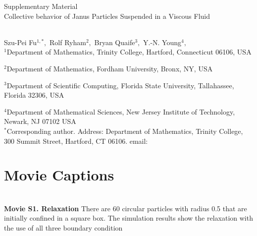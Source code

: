 
\thispagestyle{empty}

\newpage
{\Large \bf

  \noindent Supplementary Material\\

  \noindent 
  Collective behavior of Janus Particles  Suspended in a Viscous Fluid}\\

\noindent 
Szu-Pei Fu$^{1,*},$ 
Rolf Ryham$^{2},$ 
Bryan Quaife$^{3},$ 
Y.-N. Young$^{4},$
\\

\noindent
$^{1}$Department of Mathematics, Trinity College, Hartford, Connecticut 06106, USA

\noindent
$^{2}$Department of Mathematics, Fordham University,  Bronx, NY, USA

\noindent
$^{3}$Department of Scientific Computing, Florida State University, Tallahassee, Florida 32306, USA

\noindent
$^{4}$Department of Mathematical Sciences, New Jersey Institute of Technology, Newark, NJ  07102 USA
\\

\noindent $^*$Corresponding author. Address: Department of Mathematics, Trinity College, 
300 Summit Street, Hartford, CT 06106. email: 



\setcounter{page}{1}

\setcounter{figure}{0}
\renewcommand{\thefigure}{S\arabic{figure}}

\setcounter{equation}{0}
\renewcommand{\theequation}{S\arabic{equation}}

\setcounter{section}{0}
\renewcommand{\thesection}{S\arabic{section}}   





\sloppy
\section{Movie Captions}\mbox{} \\

\noindent
{\bf Movie S1. Relaxation} 
There are 60 circular particles with radius 0.5 that are initially confined in a square box.
 The simulation results show the relaxation with the use of all three boundary condition





